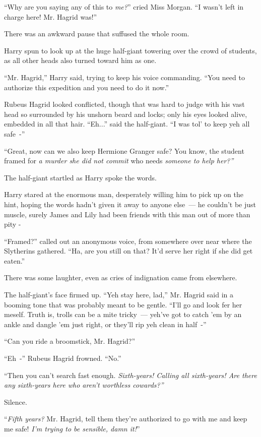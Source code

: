 ``Why are you saying any of this to \emph{me?}'' cried Miss Morgan. ``I wasn't left in charge here! Mr. Hagrid was!''

There was an awkward pause that suffused the whole room.

Harry spun to look up at the huge half-giant towering over the crowd of students, as all other heads also turned toward him as one.

``Mr. Hagrid,'' Harry said, trying to keep his voice commanding. ``You need to authorize this expedition and you need to do it now.''

Rubeus Hagrid looked conflicted, though that was hard to judge with his vast head so surrounded by his unshorn beard and locks; only his eyes looked alive, embedded in all that hair. ``Eh...'' said the half-giant. ``I was tol' to keep yeh all safe~-''

``Great, now can we also keep Hermione Granger safe? You know, the student framed for \emph{a murder she did not commit} who needs \emph{someone to help her?''}

The half-giant startled as Harry spoke the words.

Harry stared at the enormous man, desperately willing him to pick up on the hint, hoping the words hadn't given it away to anyone else~--- he couldn't be just muscle, surely James and Lily had been friends with this man out of more than pity -

``Framed?'' called out an anonymous voice, from somewhere over near where the Slytherins gathered. ``Ha, are you still on that? It'd serve her right if she did get eaten.''

There was some laughter, even as cries of indignation came from elsewhere.

The half-giant's face firmed up. ``Yeh stay here, lad,'' Mr. Hagrid said in a booming tone that was probably meant to be gentle. ``I'll go and look fer her meself. Truth is, trolls can be a mite tricky~--- yeh've got to catch 'em by an ankle and dangle 'em just right, or they'll rip yeh clean in half~-''

``Can you ride a broomstick, Mr. Hagrid?''

``Eh~-'' Rubeus Hagrid frowned. ``No.''

``Then you can't search fast enough. \emph{Sixth-years! Calling all sixth-years! Are there any sixth-years here who aren't worthless cowards?''}

Silence.

``\emph{Fifth years?} Mr. Hagrid, tell them they're authorized to go with me and keep me safe! \emph{I'm trying to be sensible, damn it!}''


